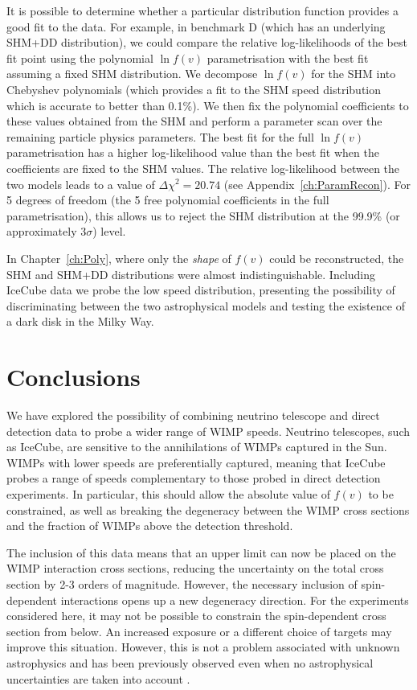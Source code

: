 It is possible to determine whether a particular distribution function provides a good fit to the data. For example, in benchmark D (which has an underlying SHM+DD distribution), we could compare the relative log-likelihoods of the best fit point using the polynomial $\ln f(v)$ parametrisation with the best fit assuming a fixed SHM distribution. We decompose $\ln f(v)$ for the SHM into Chebyshev polynomials (which provides a fit to the SHM speed distribution which is accurate to better than 0.1\%). We then fix the polynomial coefficients to these values obtained from the SHM and perform a parameter scan over the remaining particle physics parameters. The best fit for the full $\ln f(v)$ parametrisation has a higher log-likelihood value than the best fit when the coefficients are fixed to the SHM values. The relative log-likelihood between the two models leads to a value of $\Delta \chi^2 = 20.74$ (see Appendix~\ref{ch:ParamRecon}). For 5 degrees of freedom (the 5 free polynomial coefficients in the full parametrisation), this allows us to reject the SHM distribution at the 99.9\% (or approximately $3\sigma$) level.

 In Chapter~\ref{ch:Poly}, where only the \textit{shape} of $f(v)$ could be reconstructed, the SHM and SHM+DD distributions were almost indistinguishable. Including IceCube data we probe the low speed distribution, presenting the possibility of discriminating between the two astrophysical models and testing the existence of a dark disk in the Milky Way.



\section{Conclusions}

We have explored the possibility of combining neutrino telescope and direct detection data to probe a wider range of WIMP speeds. Neutrino telescopes, such as IceCube, are sensitive to the annihilations of WIMPs captured in the Sun. WIMPs with lower speeds are preferentially captured, meaning that IceCube probes a range of speeds complementary to those probed in direct detection experiments. In particular, this should allow the absolute value of $f(v)$ to be constrained, as well as breaking the degeneracy between the WIMP cross sections and the fraction of WIMPs above the detection threshold.

The inclusion of this data means that an upper limit can now be placed on the WIMP interaction cross sections, reducing the uncertainty on the total cross section by 2-3 orders of magnitude. However, the necessary inclusion of spin-dependent interactions opens up a new degeneracy direction. For the experiments considered here, it may not be possible to constrain the spin-dependent cross section from below. An increased exposure or a different choice of targets may improve this situation. However, this is not a problem associated with unknown astrophysics and has been previously observed even when no astrophysical uncertainties are taken into account \cite{Cerdeno:2013}.

